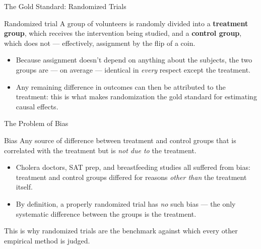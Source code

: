 \documentclass[11pt,aspectratio=169]{beamer}
\begin{document}
\begin{frame}{The Gold Standard: Randomized Trials}
  \begin{block}{Randomized trial}
    A group of volunteers is randomly divided into a \textbf{treatment group}, which receives the intervention being studied, and a \textbf{control group}, which does not --- effectively, assignment by the flip of a coin.
  \end{block}
  \vspace{0.5em}
  \begin{itemize}
    \item Because assignment doesn't depend on anything about the subjects, the two groups are --- on average --- identical in \emph{every} respect except the treatment.
    \item Any remaining difference in outcomes can then be attributed to the treatment: this is what makes randomization the gold standard for estimating causal effects.
  \end{itemize}
\end{frame}

\begin{frame}{The Problem of Bias}
  \begin{block}{Bias}
    Any source of difference between treatment and control groups that is correlated with the treatment but is \emph{not due to} the treatment.
  \end{block}
  \vspace{0.3em}
  \begin{itemize}
    \item Cholera doctors, SAT prep, and breastfeeding studies all suffered from bias: treatment and control groups differed for reasons \emph{other than} the treatment itself.
    \item By definition, a properly randomized trial has \emph{no} such bias --- the only systematic difference between the groups is the treatment.
  \end{itemize}
  \vspace{0.3em}
 
  \alert{This is why randomized trials are the benchmark against which every other empirical method is judged.}
\end{frame}

 
\end{document}
